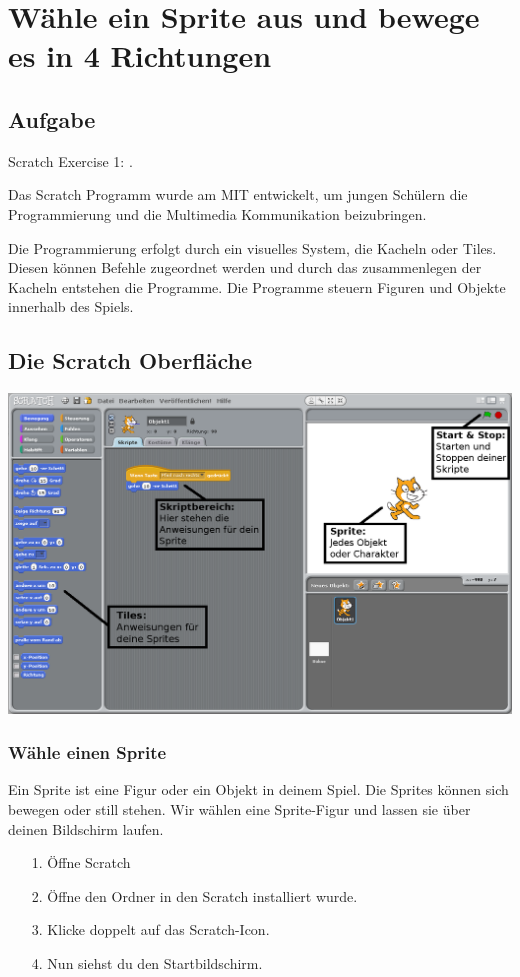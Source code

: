 \section{Wähle ein Sprite aus und bewege es in 4 Richtungen}
\subsection{Aufgabe}
Scratch Exercise 1: .

Das Scratch Programm wurde am MIT entwickelt, um jungen Schülern die Programmierung und die Multimedia Kommunikation beizubringen. 

Die Programmierung erfolgt durch ein visuelles System, die Kacheln oder Tiles. Diesen können Befehle zugeordnet werden und durch das zusammenlegen der Kacheln entstehen die Programme. Die Programme steuern Figuren und Objekte innerhalb des Spiels.


\subsection{Die Scratch Oberfläche}
\includegraphics[width=\textwidth]{images/example1_overview.png}

\subsubsection{Wähle einen Sprite}

Ein Sprite ist eine Figur oder ein Objekt in deinem Spiel. Die Sprites können sich bewegen oder still stehen. Wir wählen eine Sprite-Figur und lassen sie über deinen Bildschirm laufen.
\begin{itemize}
\item[1.] Öffne Scratch
\item[2.] Öffne den Ordner in den Scratch installiert wurde.
\item[3.] Klicke doppelt auf das Scratch-Icon.
\item[4.] Nun siehst du den Startbildschirm.
\end{itemize}

